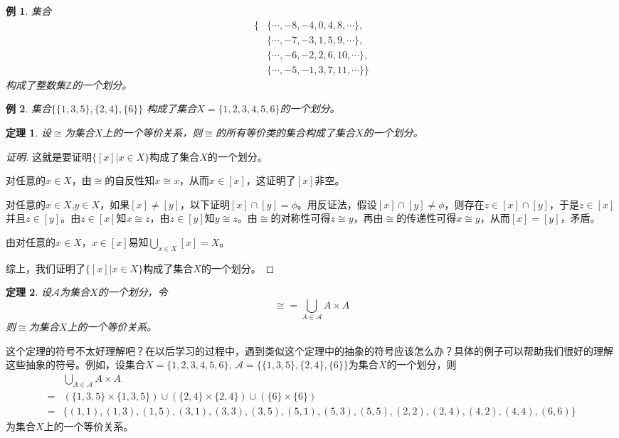 \documentclass{book}[oneside]
\newtheorem{Thm}{定理}[chapter]
\newtheorem{Example}{例}[chapter]
\begin{document}
\begin{CJK*}{UTF8}{gbsn}
  \begin{Example}
    集合
    \begin{equation*}
      \begin{split}
      \{&\{\cdots,-8,-4,0,4,8,\cdots\},\\
      &\{\cdots,-7,-3,1,5,9,\cdots\},\\
      &\{\cdots,-6,-2,2,6,10,\cdots\},\\
      &\{\cdots,-5,-1,3,7,11,\cdots\}\}
    \end{split}
  \end{equation*}
构成了整数集$\mathbb{Z}$的一个划分。
\end{Example}

  \begin{Example}
    集合$\{\{1,3,5\},\{2,4\},\{6\}\}$
构成了集合$X=\{1,2,3,4,5,6\}$的一个划分。
  \end{Example}

  \begin{Thm}\label{thm1}
    设$\cong$为集合$X$上的一个等价关系，则$\cong$的所有等价类的集合构成了集合$X$的一个划分。
  \end{Thm}
  \begin{proof}[证明]
    这就是要证明$\{[x]|x\in X\}$构成了集合$X$的一个划分。

    对任意的$x\in X$，由$\cong$的自反性知$x\cong x$，从而$x\in [x]$，这证明了$[x]$非空。

    对任意的$x\in X$,$y\in X$，如果$[x]\neq [y]$，以下证明$[x]\cap [y]=\phi$。用反证法，假设$[x]\cap [y]\neq \phi$，则存在$z\in [x]\cap [y]$，于是$z\in [x]$并且$z\in [y]$。由$z\in [x]$知$x\cong z$，由$z\in [y]$知$y\cong z$。由$\cong$的对称性可得$z\cong y$，再由$\cong$的传递性可得$x\cong y$，从而$[x]=[y]$，矛盾。

    由对任意的$x\in X$，$x\in [x]$易知$\bigcup_{x\in X}[x]=X$。

    综上，我们证明了$\{[x]|x\in X\}$构成了集合$X$的一个划分。
  \end{proof}
  \begin{Thm}\label{thm2}
    设$\mathscr{A}$为集合$X$的一个划分，令\[\cong = \bigcup_{A\in \mathscr{A}}A\times A\]
    则$\cong$为集合$X$上的一个等价关系。
  \end{Thm}
  这个定理的符号不太好理解吧？在以后学习的过程中，遇到类似这个定理中的抽象的符号应该怎么办？具体的例子可以帮助我们很好的理解这些抽象的符号。例如，设集合$X=\{1,2,3,4,5,6\}$, $\mathscr{A}=\{\{1,3,5\},\{2,4\},\{6\}\}$为集合$X$的一个划分，则
  \begin{equation*}
    \begin{split}
      &\bigcup_{A\in \mathscr{A}}A\times A\\
      =&(\{1,3,5\} \times \{1,3,5\}) \cup (\{2,4\}\times \{2,4\}) \cup (\{6\}\times \{6\})\\
      =&\{(1,1),(1,3),(1,5),(3,1),(3,3),(3,5),(5,1),(5,3),(5,5),(2,2),(2,4),(4,2),(4,4),(6,6)\}
    \end{split}
  \end{equation*}
  为集合$X$上的一个等价关系。


\end{CJK*}
\end{document}
